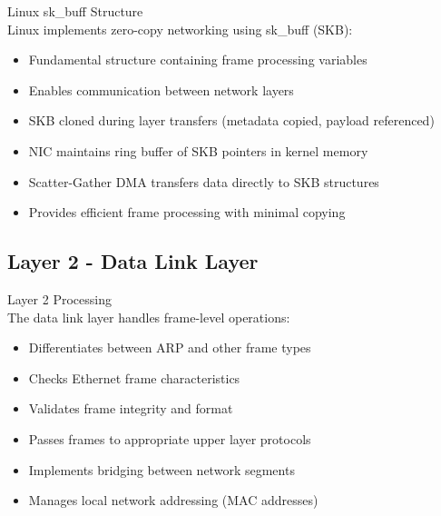 \begin{definition}{Linux sk\_buff Structure}\\
    Linux implements zero-copy networking using sk\_buff (SKB):
    \begin{itemize}
        \item Fundamental structure containing frame processing variables
        \item Enables communication between network layers
        \item SKB cloned during layer transfers (metadata copied, payload referenced)
        \item NIC maintains ring buffer of SKB pointers in kernel memory
        \item Scatter-Gather DMA transfers data directly to SKB structures
        \item Provides efficient frame processing with minimal copying
    \end{itemize}
\end{definition}

\subsection{Layer 2 - Data Link Layer}

\begin{definition}{Layer 2 Processing}\\
    The data link layer handles frame-level operations:
    \begin{itemize}
        \item Differentiates between ARP and other frame types
        \item Checks Ethernet frame characteristics
        \item Validates frame integrity and format
        \item Passes frames to appropriate upper layer protocols
        \item Implements bridging between network segments
        \item Manages local network addressing (MAC addresses)
    \end{itemize}
\end{definition}

